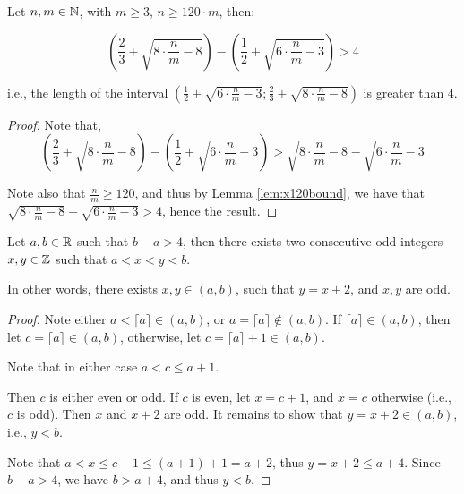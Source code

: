 \begin{lemma}
    \label{lem:IntervalLength}

    Let $n, m\in \mathbb{N}$, with $m\geq 3$, $n\geq 120 \cdot m$, then:

    \[
        \left(\frac{2}{3} + \sqrt{8 \cdot \frac{n}{m} - 8}\right) - \left(\frac{1}{2} + \sqrt{6 \cdot \frac{n}{m} - 3}\right) > 4
    \]

    i.e., the length of the interval $\left(\frac{1}{2}+\sqrt{6\cdot \frac{n}{m}-3}; \frac{2}{3} + \sqrt{8\cdot \frac{n}{m} - 8}\right)$ is greater than 4.
\end{lemma}

\begin{proof}
    Note that,
    \[
        \left(\frac{2}{3} + \sqrt{8 \cdot \frac{n}{m} - 8}\right) - \left(\frac{1}{2} + \sqrt{6 \cdot \frac{n}{m} - 3}\right) > \sqrt{8\cdot \frac{n}{m} - 8} - \sqrt{6\cdot \frac{n}{m} - 3}
    \]

    Note also that $\frac{n}{m}\geq 120$, and thus by Lemma \ref{lem:x120bound}, we have that $\sqrt{8\cdot \frac{n}{m} - 8} - \sqrt{6\cdot \frac{n}{m} - 3} > 4$, hence the result.
\end{proof}

%
%

\begin{lemma}
    \label{lem:ExistsOddPair}
    \leanok

    Let $a,b\in \mathbb{R}$ such that $b - a > 4$, then there exists two consecutive odd integers $x,y\in \mathbb{Z}$ such that $a < x < y < b$.

    In other words, there exists $x,y\in (a,b)$, such that $y=x+2$, and $x,y$ are odd.
\end{lemma}

\begin{proof}
    \leanok
    Note either $a<\lceil{a}\rceil\in (a,b)$, or $a=\lceil{a}\rceil\notin (a,b)$. If $\lceil{a}\rceil\in (a,b)$, then let $c=\lceil{a}\rceil\in (a,b)$, otherwise, let $c=\lceil{a}\rceil+1\in (a,b)$.

    Note that in either case $a<c \leq a + 1$.

    Then $c$ is either even or odd. If $c$ is even, let $x=c+1$, and $x=c$ otherwise (i.e., $c$ is odd). Then $x$ and $x+2$ are odd. It remains to show that $y=x+2\in (a,b)$, i.e., $y < b$.

    Note that $a<x\leq c + 1\leq (a + 1) + 1= a + 2$, thus $y=x+2\leq a + 4$. Since $b - a > 4$, we have $b > a + 4$, and thus $y < b$.
\end{proof}

